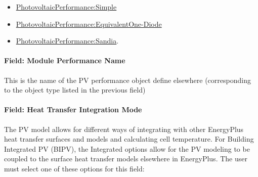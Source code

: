 \begin{itemize}
\item
  \hyperref[photovoltaicperformancesimple]{PhotovoltaicPerformance:Simple}
\item
  \hyperref[photovoltaicperformanceequivalentone-diode]{PhotovoltaicPerformance:EquivalentOne-Diode}
\item
  \hyperref[photovoltaicperformancesandia]{PhotovoltaicPerformance:Sandia}.
\end{itemize}

\paragraph{Field: Module Performance Name}\label{field-module-performance-name}

This is the name of the PV performance object define elsewhere (corresponding to the object type listed in the previous field)

\paragraph{Field: Heat Transfer Integration Mode}\label{field-heat-transfer-integration-mode}

The PV model allows for different ways of integrating with other EnergyPlus heat transfer surfaces and models and calculating cell temperature. For Building Integrated PV (BIPV), the Integrated options allow for the PV modeling to be coupled to the surface heat transfer models elsewhere in EnergyPlus. The user must select one of these options for this field:

